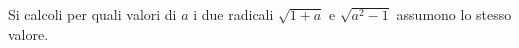 Si calcoli per quali valori di $a$ i due radicali
$\sqrt{1+a}$ e $\sqrt{a^2 - 1}$
assumono lo stesso valore.